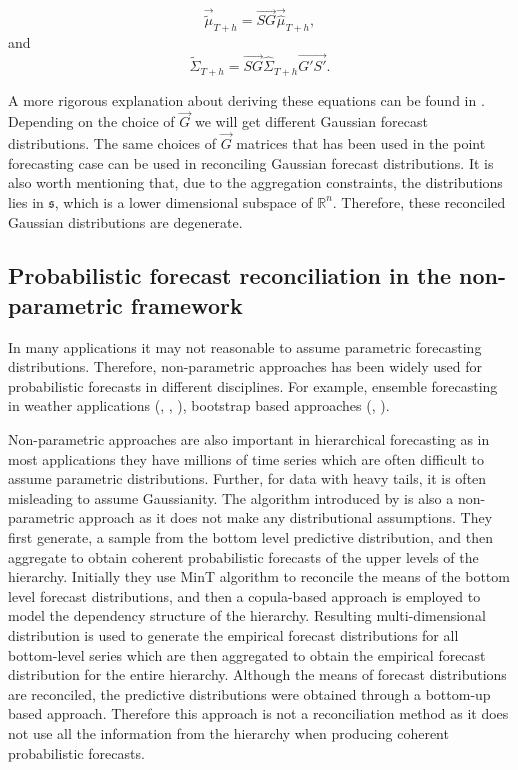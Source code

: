 \documentclass[graybox]{svmult}
\begin{document}
\begin{equation}\label{eq:17}
\vec{\tilde{\mu}}_{T+h} = \vec{SG}\vec{\hat{\mu}}_{T+h},
\end{equation} 
and
\begin{equation}\label{eq:18}
\tilde{\Sigma}_{T+h} = \vec{SG}\hat{\Sigma}_{T+h}\vec{G'S'}.
\end{equation} 

A more rigorous explanation about deriving these equations can be found in \cite{Gamakumara2018}. Depending on the choice of $\vec{G}$ we will get different Gaussian forecast distributions. The same choices of $\vec{G}$ matrices that has been used in the point forecasting case can be used in reconciling Gaussian forecast distributions. It is also worth mentioning that, due to the aggregation constraints, the distributions lies in $\mathfrak{s}$, which is a lower dimensional subspace of $\mathbb{R}^n$. Therefore, these reconciled Gaussian distributions are degenerate. 


\subsection{Probabilistic forecast reconciliation in the non-parametric framework}

In many applications it may not reasonable to assume parametric forecasting distributions. Therefore, non-parametric approaches has been widely used for probabilistic forecasts in different disciplines. For example, ensemble forecasting in weather applications (\cite{Gneiting2005}, \cite{Gneiting2014}, \cite{Gneiting2008}), bootstrap based approaches (\cite{Manzan2008}, \cite{Vilar2013}). 

Non-parametric approaches are also important in hierarchical forecasting as in most applications they have millions of time series which are often difficult to assume parametric distributions. Further, for data with heavy tails, it is often misleading to assume Gaussianity. The algorithm introduced by \cite{Taieb2017} is also a non-parametric approach as it does not make any distributional assumptions. They first generate, a sample from the bottom level predictive distribution, and then aggregate to obtain coherent probabilistic forecasts of the upper levels of the hierarchy. Initially they use MinT algorithm to reconcile the means of the bottom level forecast distributions, and then a copula-based approach is employed to model the dependency structure of the hierarchy. Resulting multi-dimensional distribution is used to generate the empirical forecast distributions for all bottom-level series which are then aggregated to obtain the empirical forecast distribution for the entire hierarchy. Although the means of forecast distributions are reconciled, the predictive distributions were obtained through a bottom-up based approach. Therefore this approach is not a reconciliation method as it does not use all the information from the hierarchy when producing coherent probabilistic forecasts. 
\end{document}
